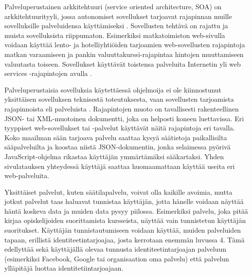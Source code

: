 Palveluperustainen arkkitehtuuri (service oriented architecture, SOA) on arkkitehtuurityyli, jossa autonomiset sovellukset tarjoavat rajapinnan muille sovelluksille palveluidensa käyttämiseksi \cite{soa}. Sovellusten tehtävä on rajattu ja muista sovelluksista riippumaton. Esimerkiksi matkatoimiston web-sivulla voidaan käyttää lento- ja hotelliyhtiöiden tarjoamien web-sovellusten rajapintoja matkan varaamiseen ja pankin valuuttakurssi-rajapintaa hintojen muuttamiseen valuutasta toiseen. Sovellukset käyttävät toistensa palveluita Internetin yli web services -rajapintojen avulla \cite{soa}.

Palveluperustaisia sovelluksia käytettäessä ohjelmoija ei ole kiinnostunut yksittäisen sovelluksen teknisestä toteutuksesta, vaan sovellusten tarjoamista rajapinnoista eli palveluista \cite{soa}. Rajapintojen muoto on tavallisesti rakenteellinen JSON- tai XML-muotoinen dokumentti, joka on helposti koneen luettavissa. Eri tyyppiset web-sovellukset tai -palvelut käyttävät näitä rajapintoja eri tavalla. Koko maailman sään tarjoava palvelu saattaa kysyä säätietoja paikallisilta sääpalveluilta ja koostaa niistä JSON-dokumentin, jonka selaimessa pyörivä JavaScript-ohjelma rikastaa käyttäjän ymmärtämäksi sääkartaksi. Yhden sivulatauksen yhteydessä käyttäjä saattaa huomaamattaan käyttää useita eri web-palveluita.

Yksittäiset palvelut, kuten säätilapalvelu, voivat olla kaikille avoimia, mutta jotkut palvelut taas haluavat tunnistaa käyttäjän, jotta hänelle voidaan näyttää häntä koskeva data ja muiden data pysyy piilossa. Esimerkiksi palvelu, joka pitää kirjaa opiskelijoiden suorittamista kursseista, näyttää vain tunnistetun käyttäjän suoritukset. Käyttäjän tunnistautumiseen voidaan käyttää, muiden palveluiden tapaan, erillistä identiteetintarjoajaa, josta kerrotaan enemmän luvussa 4. Tämä edellyttää sekä käyttäjällä olevaa tunnusta identiteetintarjoajan palveluun (esimerkiksi Facebook, Google tai organisaation oma palvelu) että palvelun ylläpitäjä luottaa identitetiintarjoajaan.